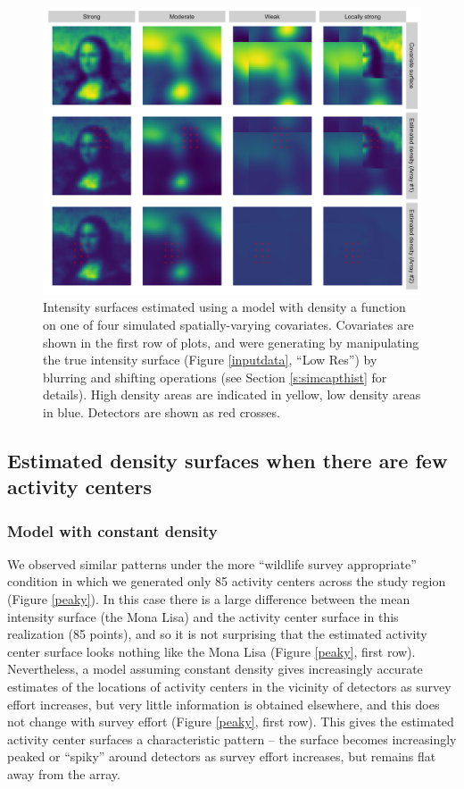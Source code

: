 \documentclass[a4paper,12pt]{article}
\begin{document}
\begin{figure}[htbp]
\centering
\includegraphics[width=1\textwidth]{mona_covariates.png}
\caption{Intensity surfaces estimated using a model with density a function on one of four simulated spatially-varying covariates. Covariates are shown in the first row of plots, and were generating by manipulating the true intensity surface (Figure \ref{inputdata}, ``Low Res'') by blurring and shifting operations (see Section \ref{s:simcapthist} for details). High density areas are indicated in yellow, low density areas in blue. Detectors are shown as red crosses.} 
\label{covariates}
\end{figure}

\subsection{Estimated density surfaces when there are few activity centers}

\subsubsection{Model with constant density}

We observed similar patterns under the more ``wildlife survey appropriate'' condition in which we generated only 85 activity centers across the study region (Figure \ref{peaky}). In this case there is a large difference between the mean intensity surface (the Mona Lisa) and the activity center surface in this realization (85 points), and so it is not surprising that the estimated activity center surface looks nothing like the Mona Lisa (Figure \ref{peaky}, first row). Nevertheless, a model assuming constant density gives increasingly accurate estimates of the locations of activity centers in the vicinity of detectors as survey effort increases, but very little information is obtained elsewhere, and this does not change with survey effort (Figure \ref{peaky}, first row). This gives the estimated activity center surfaces a characteristic pattern -- the surface becomes increasingly peaked or ``spiky'' around detectors as survey effort increases, but remains flat away from the array. 
\end{document}
